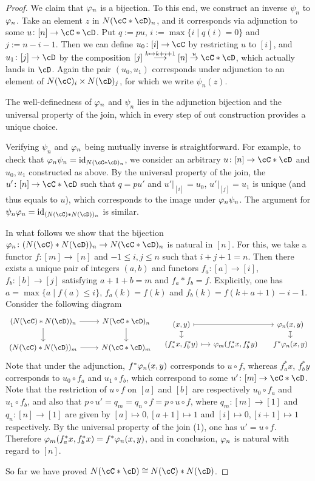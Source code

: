 \documentclass[a4paper,11pt,openany]{scrartcl}
\begin{document}
\begin{proof}
We claim that $\varphi_n$ is a bijection. To this end, we construct an inverse $\psi_n$ to $\varphi_n$. Take an element $z$ in $N(\cC*\cD)_n$, and it corresponds via adjunction to some $u\colon[n]\to\cC*\cD$. Put $q:=pu$, $i:=\max\{i\mid q(i)=0\}$ and $j:=n-i-1$. Then we can define $u_0\colon[i]\to \cC$ by restricting $u$ to $[i]$, and $u_1\colon[j]\to\cD$ by the composition $[j]\overset{k\mapsto k+i+1}{\longrightarrow}[n]\overset{u}{\to}\cC*\cD$, which actually lands in $\cD$. Again the pair $(u_0,u_1)$ corresponds under adjunction to an element of $N(\cC)_i\times N(\cD)_j$, for which we write $\psi_n(z)$. 

The well-definedness of $\varphi_n$ and $\psi_n$ lies in the adjunction bijection and the universal property of the join, which in every step of out construction provides a unique choice. 

Verifying $\psi_n$ and $\varphi_n$ being mutually inverse is straightforward. For example, to check that $\f_n\psi_n=\id_{N(\cC*\cD)_n}$, we consider an arbitrary $u\colon[n]\to\cC*\cD$ and $u_0,u_1$ constructed as above. By the universal property of the join, the $u'\colon[n]\to\cC*\cD$ such that $q=pu'$ and $u'|_{[i]}=u_0$, $u'|_{[j]}=u_1$ is unique (and thus equals to $u$), which corresponds to the image under $\varphi_n\psi_n$. The argument for $\psi_n\f_n=\id_{(N(\cC)*N(\cD))_n}$ is similar.

In what follows we show that the bijection $\f_n\colon (N(\cC)*N(\cD))_n\to
    N(\cC*\cD)_n$ is natural in $[n]$. For this, we take a functor $f\colon[m]\to[n]$ and $-1\leqslant i,j\leqslant n$ such that $i+j+1=n$. Then there exists a unique pair of integers $(a,b)$  and functors $f_a\colon[a]\to[i]$, $f_b\colon[b]\to[j]$ satisfying $a+1+b=m$ and $f_a*f_b=f$. Explicitly, one has $a=\max\{a\mid f(a)\leqslant i\}$, $f_a(k)=f(k)$ and $f_b(k)=f(k+a+1)-i-1$. Consider the following diagram
\[
\begin{tikzcd}
(N(\cC)*N(\cD))_n\arrow[r]\arrow[d]& N(\cC*\cD)_n\arrow[d]\\
(N(\cC)*N(\cD))_m\arrow[r]& N(\cC*\cD)_m
\end{tikzcd}
\quad
\begin{tikzcd}[sep=small]
(x,y)\arrow[rr,mapsto]\arrow[d,mapsto]&& \f_n(x,y)\arrow[d,mapsto]\\
(f^*_ax,f^*_by)\arrow[r,mapsto]& \f_m(f^*_ax,f^*_by)& f^*\f_n(x,y)
\end{tikzcd}
\]
Note that under the adjunction, $f^*\varphi_n(x,y)$ corresponds to $u\circ f$,
    whereas $f^*_ax$, $f^*_by$ corresponds to $u_0\circ f_a$ and $u_1\circ f_b$,
    which correspond to some $u'\colon[m]\to\cC*\cD$. Note that the restriction
    of $u\circ f$ on $[a]$ and $[b]$ are respectively $u_0\circ f_a$ and
    $u_1\circ f_b$, and also that $p\circ u'=q_m=q_n\circ f=p\circ u\circ f$,
    where $q_m\colon[m]\to[1]$ and $q_n\colon[n]\to[1]$ are given by
    $[a]\mapsto0,[a+1]\mapsto1$ and $[i]\mapsto0,[i+1]\mapsto1$ respectively. By
    the universal property of the join (1), one has $u'=u\circ f$. Therefore
    $\varphi_m(f^*_ax,f^*_bx)=f^*\varphi_n(x,y)$, and in conclusion, $\varphi_n$ is natural
    with regard to $[n]$.

So far we have proved $N(\cC*\cD)\cong N(\cC)* N(\cD)$.
\end{proof}
\end{document}
